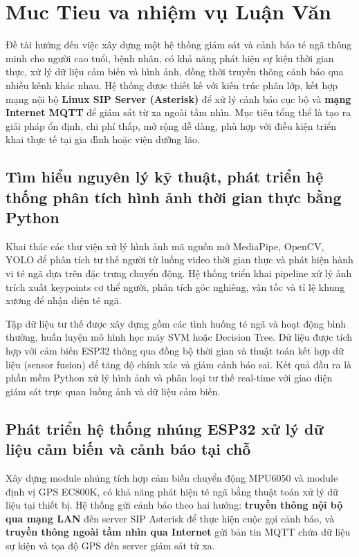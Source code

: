 
\section{Muc Tieu va nhiệm vụ Luận Văn}

Đề tài hướng đến việc xây dựng một hệ thống giám sát và cảnh báo té ngã thông minh cho người cao tuổi, bệnh nhân, có khả năng phát hiện sự kiện thời gian thực, xử lý dữ liệu cảm biến và hình ảnh, đồng thời truyền thông cảnh báo qua nhiều kênh khác nhau. Hệ thống được thiết kế với kiến trúc phân lớp, kết hợp mạng nội bộ \textbf{Linux SIP Server (Asterisk)} để xử lý cảnh báo cục bộ và \textbf{mạng Internet MQTT} để giám sát từ xa ngoài tầm nhìn. Mục tiêu tổng thể là tạo ra giải pháp ổn định, chi phí thấp, mở rộng dễ dàng, phù hợp với điều kiện triển khai thực tế tại gia đình hoặc viện dưỡng lão.

\subsection{Tìm hiểu nguyên lý kỹ thuật, phát triển hệ thống phân tích hình ảnh thời gian thực bằng Python}

Khai thác các thư viện xử lý hình ảnh mã nguồn mở MediaPipe, OpenCV, YOLO để phân tích tư thế người từ luồng video thời gian thực và phát hiện hành vi té ngã dựa trên đặc trưng chuyển động. Hệ thống triển khai pipeline xử lý ảnh trích xuất keypoints cơ thể người, phân tích góc nghiêng, vận tốc và tỉ lệ khung xương để nhận diện té ngã.

Tập dữ liệu tư thế được xây dựng gồm các tình huống té ngã và hoạt động bình thường, huấn luyện mô hình học máy SVM hoặc Decision Tree. Dữ liệu được tích hợp với cảm biến ESP32 thông qua đồng bộ thời gian và thuật toán kết hợp dữ liệu (sensor fusion) để tăng độ chính xác và giảm cảnh báo sai. Kết quả đầu ra là phần mềm Python xử lý hình ảnh và phân loại tư thế real-time với giao diện giám sát trực quan luồng ảnh và dữ liệu cảm biến.

\subsection{Phát triển hệ thống nhúng ESP32 xử lý dữ liệu cảm biến và cảnh báo tại chỗ}

Xây dựng module nhúng tích hợp cảm biến chuyển động MPU6050 và module định vị GPS EC800K, có khả năng phát hiện té ngã bằng thuật toán xử lý dữ liệu tại thiết bị. Hệ thống gửi cảnh báo theo hai hướng: \textbf{truyền thông nội bộ qua mạng LAN} đến server SIP Asterisk để thực hiện cuộc gọi cảnh báo, và \textbf{truyền thông ngoài tầm nhìn qua Internet} gửi bản tin MQTT chứa dữ liệu sự kiện và tọa độ GPS đến server giám sát từ xa.

